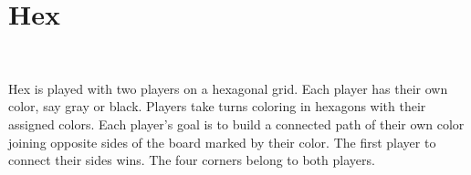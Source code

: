 \documentclass[12pt]{article}
\begin{document}
\newpage 



\section*{Hex}
\begin{figure}[h]
	\centering
    \qquad
    \\
    \caption{}
\end{figure}
\noindent Hex is played with two players on a hexagonal grid. Each player has their own color, say gray or black. Players take turns coloring in hexagons with their assigned colors. Each player's goal is to build a connected path of their own color joining opposite sides of the board marked by their color. The first player to connect their sides wins. The four corners belong to both players.\\
\end{document}
